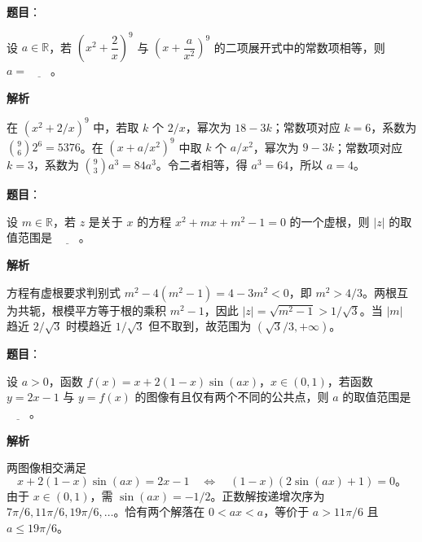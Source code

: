 \begin{answer}

\textbf{题目}：

设 $a\in\mathbb R$，若 $\left(x^2+\dfrac{2}{x}\right)^9$ 与 $\left(x+\dfrac{a}{x^2}\right)^9$ 的二项展开式中的常数项相等，则 $a=\underline{\qquad}$。

\textbf{解析}

在 $(x^2+2/x)^9$ 中，若取 $k$ 个 $2/x$，幂次为 $18-3k$；常数项对应 $k=6$，系数为 $\binom96 2^6=5376$。在 $(x+a/x^2)^9$ 中取 $k$ 个 $a/x^2$，幂次为 $9-3k$；常数项对应 $k=3$，系数为 $\binom93a^3=84a^3$。令二者相等，得 $a^3=64$，所以 $a=4$。


\end{answer}
\begin{answer}

\textbf{题目}：

设 $m\in\mathbb R$，若 $z$ 是关于 $x$ 的方程 $x^2+mx+m^2-1=0$ 的一个虚根，则 $|z|$ 的取值范围是 $\underline{\qquad}$。

\textbf{解析}

方程有虚根要求判别式 $m^2-4(m^2-1)=4-3m^2<0$，即 $m^2>4/3$。两根互为共轭，根模平方等于根的乘积 $m^2-1$，因此 $|z|=\sqrt{m^2-1}>1/\sqrt3$。当 $|m|$ 趋近 $2/\sqrt3$ 时模趋近 $1/\sqrt3$ 但不取到，故范围为 $(\sqrt3/3,+\infty)$。


\end{answer}
\begin{answer}

\textbf{题目}：

设 $a>0$，函数 $f(x)=x+2(1-x)\sin(ax)$，$x\in(0,1)$，若函数 $y=2x-1$ 与 $y=f(x)$ 的图像有且仅有两个不同的公共点，则 $a$ 的取值范围是 $\underline{\qquad}$。

\textbf{解析}

两图像相交满足
\nopagebreak[4]
\[
x+2(1-x)\sin(ax)=2x-1
\quad\Longleftrightarrow\quad
(1-x)(2\sin(ax)+1)=0\mbox{。}
\]
由于 $x\in(0,1)$，需 $\sin(ax)=-1/2$。正数解按递增次序为 $7\pi/6,11\pi/6,19\pi/6,\ldots$。恰有两个解落在 $0<ax<a$，等价于 $a>11\pi/6$ 且 $a\leq19\pi/6$。

\gkanswer{答案：$(\dfrac{11\pi}{6},\dfrac{19\pi}{6}]$}

\end{answer}
